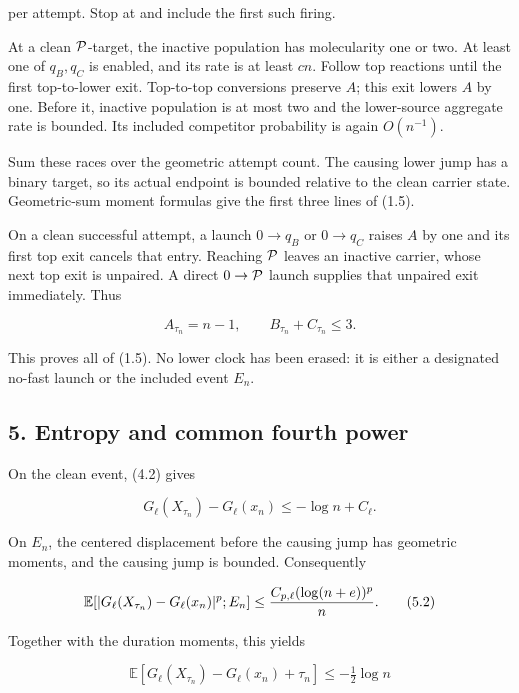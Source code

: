 per attempt. Stop at and include the first such firing.

At a clean \({\cal P}\)-target, the inactive population has molecularity
one or two. At least one of \(q_B,q_C\) is enabled, and its rate is at
least \(cn\). Follow top reactions until the first top-to-lower exit.
Top-to-top conversions preserve \(A\); this exit lowers \(A\) by one.
Before it, inactive population is at most two and the lower-source
aggregate rate is bounded. Its included competitor probability is again
\(O(n^{-1})\).

Sum these races over the geometric attempt count. The causing lower jump
has a binary target, so its actual endpoint is bounded relative to the
clean carrier state. Geometric-sum moment formulas give the first three
lines of (1.5).

On a clean successful attempt, a launch \(0\to q_B\) or \(0\to q_C\)
raises \(A\) by one and its first top exit cancels that entry. Reaching
\({\cal P}\) leaves an inactive carrier, whose next top exit is
unpaired. A direct \(0\to{\cal P}\) launch supplies that unpaired exit
immediately. Thus

\[
                  A_{\tau_n}=n-1,\qquad
                  B_{\tau_n}+C_{\tau_n}\le3.                  \tag{4.2}
\]

This proves all of (1.5). No lower clock has been erased: it is either a
designated no-fast launch or the included event \(E_n\).

\subsection{5. Entropy and common fourth
power}

On the clean event, (4.2) gives

\[
                    G_\ell(X_{\tau_n})-G_\ell(x_n)
                        \le-\log n+C_\ell.                    \tag{5.1}
\]

On \(E_n\), the centered displacement before the causing jump has
geometric moments, and the causing jump is bounded. Consequently

\[
 \mathbb E[
   |G_\ell(X_{\tau_n})-G_\ell(x_n)|^p;E_n]
       \le {C_{p,\ell}(\log(n+e))^p\over n}.                  \tag{5.2}
\]

Together with the duration moments, this yields

\[
 \mathbb E[
   G_\ell(X_{\tau_n})-G_\ell(x_n)+\tau_n]
       \le-\tfrac12\log n                                    \tag{5.3}
\]

